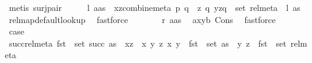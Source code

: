 \begin{isabellebody}
\ {\isacharparenleft}{\kern0pt}metis\ surj{\isacharunderscore}{\kern0pt}pair{\isacharparenright}{\kern0pt}\isanewline
\ \ \isamarkupfalse%
\ \isamarkupfalse%
\ {\isachardoublequoteopen}{\isacharquery}{\kern0pt}l\ {\isacharparenleft}{\kern0pt}a{\isacharhash}{\kern0pt}as{\isacharparenright}{\kern0pt}\ {\isacharequal}{\kern0pt}\ {\isacharbraceleft}{\kern0pt}{\isacharparenleft}{\kern0pt}{\isacharparenleft}{\kern0pt}x{\isacharcomma}{\kern0pt}z{\isacharparenright}{\kern0pt}{\isacharcomma}{\kern0pt}combine{\isacharunderscore}{\kern0pt}meta\ p\ q{\isacharparenright}{\kern0pt}\ {\isacharbar}{\kern0pt}\ z\ q{\isachardot}{\kern0pt}\ {\isacharparenleft}{\kern0pt}{\isacharparenleft}{\kern0pt}y{\isacharcomma}{\kern0pt}z{\isacharparenright}{\kern0pt}{\isacharcomma}{\kern0pt}q{\isacharparenright}{\kern0pt}\ {\isasymin}\ set\ rel{\isacharunderscore}{\kern0pt}meta{\isacharbraceright}{\kern0pt}\ {\isasymunion}\ {\isacharquery}{\kern0pt}l\ as{\isachardoublequoteclose}\ \isamarkupfalse%
\ rel{\isacharunderscore}{\kern0pt}map{\isacharunderscore}{\kern0pt}default{\isacharunderscore}{\kern0pt}lookup\ \isamarkupfalse%
\ fastforce\isanewline
\ \ \isamarkupfalse%
\ \isamarkupfalse%
\ {\isachardoublequoteopen}{\isasymdots}\ {\isacharequal}{\kern0pt}\ {\isacharquery}{\kern0pt}r\ {\isacharparenleft}{\kern0pt}a{\isacharhash}{\kern0pt}as{\isacharparenright}{\kern0pt}{\isachardoublequoteclose}\ \isamarkupfalse%
\ a{\isacharunderscore}{\kern0pt}xyb\ Cons\ \isamarkupfalse%
\ fastforce\isanewline
\ \ \isamarkupfalse%
\ \isamarkupfalse%
\ {\isacharquery}{\kern0pt}case\ \isacommand{{\isachardot}{\kern0pt}}\isamarkupfalse%
\isanewline
{}\isamarkupfalse%
%
\endisatagproof
{\isafoldproof}%
%
\isadelimproof
\isanewline
%
\endisadelimproof
\isanewline
{}\isamarkupfalse%
\ succ{\isacharunderscore}{\kern0pt}rel{\isacharunderscore}{\kern0pt}meta{\isacharcolon}{\kern0pt}\ {\isachardoublequoteopen}fst\ {\isacharbackquote}{\kern0pt}\ set\ {\isacharparenleft}{\kern0pt}succ\ as{\isacharparenright}{\kern0pt}\ {\isacharequal}{\kern0pt}\ {\isacharbraceleft}{\kern0pt}{\isacharparenleft}{\kern0pt}x{\isacharcomma}{\kern0pt}z{\isacharparenright}{\kern0pt}\ {\isacharbar}{\kern0pt}\ x\ y\ z{\isachardot}{\kern0pt}\ {\isacharparenleft}{\kern0pt}x{\isacharcomma}{\kern0pt}\ y{\isacharparenright}{\kern0pt}\ {\isasymin}\ fst\ {\isacharbackquote}{\kern0pt}\ set\ as\ {\isasymand}\ {\isacharparenleft}{\kern0pt}y{\isacharcomma}{\kern0pt}\ z{\isacharparenright}{\kern0pt}\ {\isasymin}\ fst\ {\isacharbackquote}{\kern0pt}\ set\ rel{\isacharunderscore}{\kern0pt}meta{\isacharbraceright}{\kern0pt}{\isachardoublequoteclose}\isanewline

\end{isabellebody}
